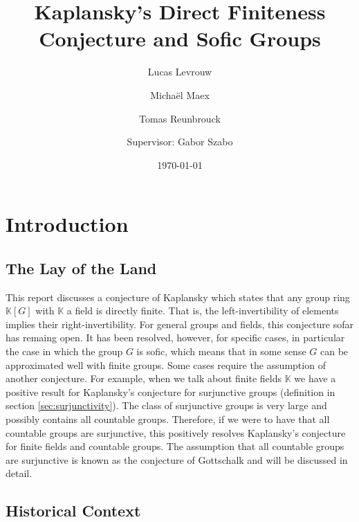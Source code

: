 \documentclass[titlepage, a4paper]{article}
\author{Lucas Levrouw \and Michaël Maex \and Tomas Reunbrouck \and Supervisor: Gabor Szabo}
\title{Kaplansky's Direct Finiteness Conjecture and Sofic Groups}
\date{\today}
\theoremstyle{remark}
\begin{document}
    \maketitle
{}
\tableofcontents
\pagebreak

\section{Introduction}\label{sec:intro}

\subsection*{The Lay of the Land}

This report discusses a conjecture of Kaplansky which states that any group ring $\mathbb{K}[G]$ with $\mathbb{K}$ a field is directly finite. That is, the left-invertibility of elements implies their right-invertibility. For general groups and fields, this conjecture sofar has remaing open. It has been resolved, however, for specific cases, in particular the case in which the group $G$ is sofic, which means that in some sense $G$ can be approximated well with finite groups. Some cases require the assumption of another conjecture. For example, when we talk about finite fields $\mathbb{K}$ we have a positive result for Kaplansky’s conjecture for surjunctive groups (definition in section \ref{sec:surjunctivity}). The class of surjunctive groups is very large and possibly contains all countable groups. Therefore, if we were to have that all countable groups are surjunctive, this positively resolves Kaplansky's conjecture for finite fields and countable groups.
The assumption that all countable groups are surjunctive is known as the conjecture of Gottschalk and will be discussed in detail.

\subsection*{Historical Context}
\end{document}
